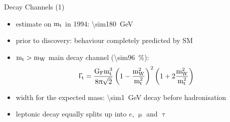 \begin{frame}{Decay Channels (1)}

	\begin{itemize}\itemfill
		\item estimate on $\text{m}_{\text{t}}$ in 1994: \SI{\sim180}{\giga\electronvolt}
		\item prior to discovery: behaviour completely predicted by SM
		\item $\text{m}_{\text{t}} > \text{m}_{\text{W}}$ \ra main decay channel (\SI{\sim96}{\%}):
		\begin{equation*} \Upgamma_{\text{t}} = \frac{\text{G}_{\text{F}}\text{m}_{\text{t}}^{3}}{8\uppi\sqrt{2}}\left(1 - \frac{\text{m}_{\text{W}}^{2}}{\text{m}_{\text{t}}^{2}}\right)^{2}\left(1 + 2\frac{\text{m}_{\text{W}}^{2}}{\text{m}_{\text{t}}^{2}}\right)\end{equation*}
		\item width for the expected mass: \SI{\sim1}{\giga\electronvolt} \ra decay before hadronisation
	\end{itemize}
	
	\begin{figure}\vspace*{-10pt}
		\centering
	\end{figure}\vspace*{-10pt}
	
	\begin{itemize}\itemfill
		\item leptonic decay equally splits up into $e$, $\upmu$ and $\uptau$
	\end{itemize}

\end{frame}

